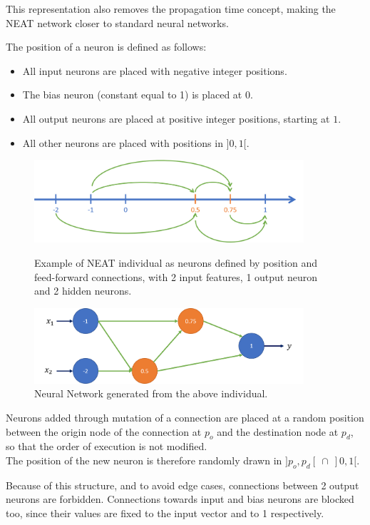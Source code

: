 This representation also removes the propagation time concept, making the NEAT network closer to standard neural networks. 

The position of a neuron is defined as follows:
\begin{itemize}
    \item All input neurons are placed with negative integer positions.  
    \item The bias neuron (constant equal to 1) is placed at $0$.  
    \item All output neurons are placed at positive integer positions, starting at $1$.
    \item All other neurons are placed with positions in $]0, 1[$.
\end{itemize}

\begin{figure}[H]
\centering
\captionsetup{justification=centering,margin=2cm}
\includegraphics[width=10cm]{images/NEAT_position.png}
\caption{Example of NEAT individual as neurons defined by position and feed-forward connections, with 2 input features, 1 output neuron and 2 hidden neurons.}
\includegraphics[width=10cm]{images/NEAT_network.png}
\caption{Neural Network generated from the above individual.}
 \label{NEAT_network}
\end{figure}

Neurons added through mutation of a connection are placed at a random position between the origin node of the connection at $p_o$ and the destination node at $p_d$, so that the order of execution is not modified. \\
The position of the new neuron is therefore randomly drawn in $]p_o, p_d[ \: \cap \: ]0, 1[$.

Because of this structure, and to avoid edge cases, connections between 2 output neurons are forbidden. Connections towards input and bias neurons are blocked too, since their values are fixed to the input vector and to 1 respectively.

